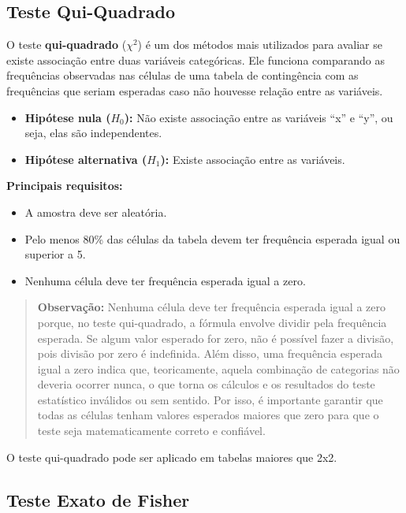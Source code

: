 \documentclass[
]{book}
\providecommand{\tightlist}{%
  \setlength{\itemsep}{0pt}\setlength{\parskip}{0pt}}
\begin{document}
\subsection{Teste Qui-Quadrado}\label{teste-qui-quadrado}

O teste \textbf{qui-quadrado} (\(\chi^2\)) é um dos métodos mais utilizados para avaliar se existe associação entre duas variáveis categóricas. Ele funciona comparando as frequências observadas nas células de uma tabela de contingência com as frequências que seriam esperadas caso não houvesse relação entre as variáveis.

\begin{itemize}
\tightlist
\item
  \textbf{Hipótese nula (\(H_0\)):} Não existe associação entre as variáveis ``x'' e ``y'', ou seja, elas são independentes.
\item
  \textbf{Hipótese alternativa (\(H_1\)):} Existe associação entre as variáveis.
\end{itemize}

\textbf{Principais requisitos:}

\begin{itemize}
\item
  A amostra deve ser aleatória.
\item
  Pelo menos 80\% das células da tabela devem ter frequência esperada igual ou superior a 5.
\item
  Nenhuma célula deve ter frequência esperada igual a zero.
\end{itemize}

\begin{quote}
\textbf{Observação:} Nenhuma célula deve ter frequência esperada igual a zero porque, no teste qui-quadrado, a fórmula envolve dividir pela frequência esperada. Se algum valor esperado for zero, não é possível fazer a divisão, pois divisão por zero é indefinida. Além disso, uma frequência esperada igual a zero indica que, teoricamente, aquela combinação de categorias não deveria ocorrer nunca, o que torna os cálculos e os resultados do teste estatístico inválidos ou sem sentido. Por isso, é importante garantir que todas as células tenham valores esperados maiores que zero para que o teste seja matematicamente correto e confiável.
\end{quote}

O teste qui-quadrado pode ser aplicado em tabelas maiores que 2x2.

\subsection{Teste Exato de Fisher}\label{teste-exato-de-fisher}
\end{document}

